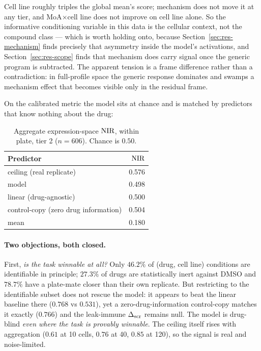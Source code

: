 Cell line roughly triples the global mean's score; mechanism does not move it at any tier, and
MoA$\times$cell line does not improve on cell line alone. So the informative conditioning variable in
this data is the cellular context, not the compound class --- which is worth holding onto, because
Section~\ref{sec:res-mechanism} finds precisely that asymmetry inside the model's activations, and
Section~\ref{sec:res-scope} finds that mechanism does carry signal once the generic program is
subtracted. The apparent tension is a frame difference rather than a contradiction: in full-profile
space the generic response dominates and swamps a mechanism effect that becomes visible only in the
residual frame.

On the calibrated metric the model sits at chance and is matched by predictors that know nothing
about the drug:

\begin{table}[h]
\centering
\begin{tabular}{lr}
\toprule
Predictor & $\textrm{NIR}$ \\
\midrule
ceiling (real replicate) & 0.576 \\
model & 0.498 \\
linear (drug-agnostic) & 0.500 \\
control-copy (zero drug information) & 0.504 \\
mean & 0.180 \\
\bottomrule
\end{tabular}
\caption{Aggregate expression-space $\textrm{NIR}$, within plate, tier 2 ($n=606$). Chance is $0.50$.}
\label{tab:nir-aggregate}
\end{table}

\paragraph{Two objections, both closed.} First, \emph{is the task winnable at all?} Only $46.2\%$ of
(drug, cell line) conditions are identifiable in principle; $27.3\%$ of drugs are statistically
inert against DMSO and $78.7\%$ have a plate-mate closer than their own replicate. But restricting
to the identifiable subset does not rescue the model: it appears to beat the linear baseline there
($0.768$ vs $0.531$), yet a zero-drug-information control-copy matches it exactly ($0.766$) and the
leak-immune $\Delta_{\textrm{scr}}$ remains null. The model is drug-blind \emph{even where the task is provably
winnable}. The ceiling itself rises with aggregation ($0.61$ at 10 cells, $0.76$ at 40, $0.85$ at
120), so the signal is real and noise-limited.

